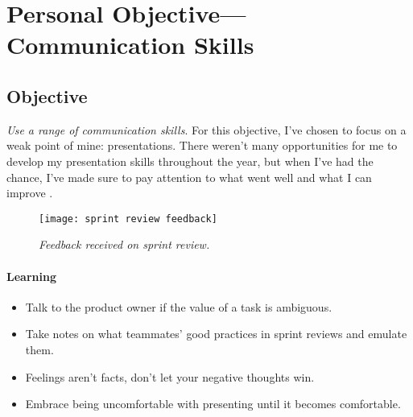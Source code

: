 \section{Personal Objective---Communication Skills}
\subsection{Objective}
\emph{Use a range of communication skills}. 
For this objective, I've chosen to focus on a weak point of mine: presentations. There weren't many opportunities for me to develop my presentation skills throughout the year, but when I've had the chance, I've made sure to pay attention to what went well and what I can improve \parencite[][p. 5, entry 23/04/2021]{scanlan_2021}.

\begin{figure}[ht]
    \caption{\small{\emph{Feedback received on sprint review.}}}
    \texttt{[image: sprint review feedback]}
    \label{fig:revfeedback}
\end{figure}

\paragraph{Learning}
\begin{itemize}
    \item Talk to the product owner if the value of a task is ambiguous.
    \item Take notes on what teammates' good practices in sprint reviews and emulate them.
    \item Feelings aren't facts, don't let your negative thoughts win.
    \item Embrace being uncomfortable with presenting until it becomes comfortable.
\end{itemize}
